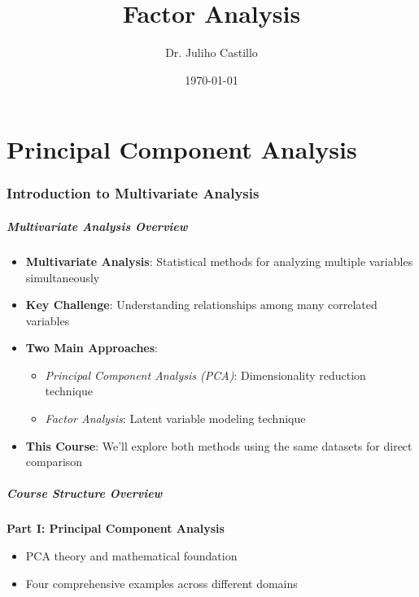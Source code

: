 \documentclass[aspectratio=169]{beamer}
\title{Factor Analysis}
\author{Dr. Juliho Castillo}
\institute{Tecnológico de Monterrey}
\date{\today}
\begin{document}
\begin{frame}
    \titlepage
\end{frame}

\begin{frame}
    \tableofcontents
\end{frame}


\part{Principal Component Analysis}

\begin{frame}
    \partpage
\end{frame}

\section{Introduction to Multivariate Analysis}

\begin{frame}[fragile]
    \frametitle{Multivariate Analysis Overview}
    \begin{itemize}
        \item \textbf{Multivariate Analysis}: Statistical methods for analyzing multiple variables simultaneously \pause
        \item \textbf{Key Challenge}: Understanding relationships among many correlated variables \pause
        \item \textbf{Two Main Approaches}: 
              \begin{itemize}
                  \item \textit{Principal Component Analysis (PCA)}: Dimensionality reduction technique \pause
                  \item \textit{Factor Analysis}: Latent variable modeling technique \pause
              \end{itemize}
        \item \textbf{This Course}: We'll explore both methods using the same datasets for direct comparison
    \end{itemize}
\end{frame}

\begin{frame}[fragile]
    \frametitle{Course Structure Overview}
    \textbf{Part I: Principal Component Analysis}
    \begin{itemize}
        \item PCA theory and mathematical foundation
        \item Four comprehensive examples across different domains
    \end{itemize}
\end{frame}
\end{document}
